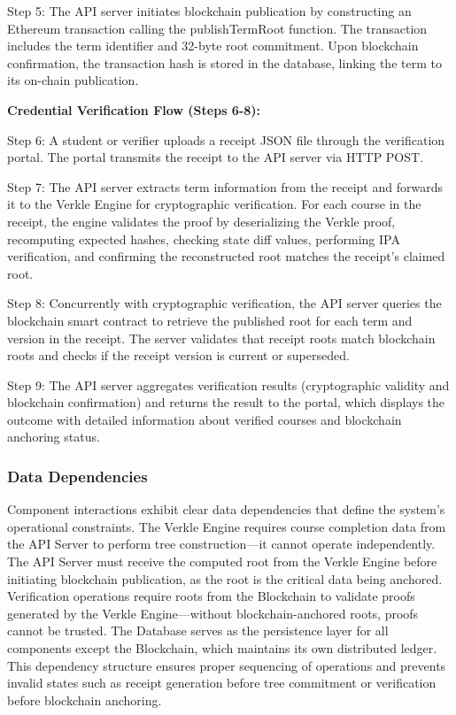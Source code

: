 Step 5: The API server initiates blockchain publication by constructing an Ethereum transaction calling the publishTermRoot function. The transaction includes the term identifier and 32-byte root commitment. Upon blockchain confirmation, the transaction hash is stored in the database, linking the term to its on-chain publication.

\textbf{Credential Verification Flow (Steps 6-8):}

Step 6: A student or verifier uploads a receipt JSON file through the verification portal. The portal transmits the receipt to the API server via HTTP POST.

Step 7: The API server extracts term information from the receipt and forwards it to the Verkle Engine for cryptographic verification. For each course in the receipt, the engine validates the proof by deserializing the Verkle proof, recomputing expected hashes, checking state diff values, performing IPA verification, and confirming the reconstructed root matches the receipt's claimed root.

Step 8: Concurrently with cryptographic verification, the API server queries the blockchain smart contract to retrieve the published root for each term and version in the receipt. The server validates that receipt roots match blockchain roots and checks if the receipt version is current or superseded.

Step 9: The API server aggregates verification results (cryptographic validity and blockchain confirmation) and returns the result to the portal, which displays the outcome with detailed information about verified courses and blockchain anchoring status.

\subsubsection{Data Dependencies}

Component interactions exhibit clear data dependencies that define the system's operational constraints. The Verkle Engine requires course completion data from the API Server to perform tree construction—it cannot operate independently. The API Server must receive the computed root from the Verkle Engine before initiating blockchain publication, as the root is the critical data being anchored. Verification operations require roots from the Blockchain to validate proofs generated by the Verkle Engine—without blockchain-anchored roots, proofs cannot be trusted. The Database serves as the persistence layer for all components except the Blockchain, which maintains its own distributed ledger. This dependency structure ensures proper sequencing of operations and prevents invalid states such as receipt generation before tree commitment or verification before blockchain anchoring.

